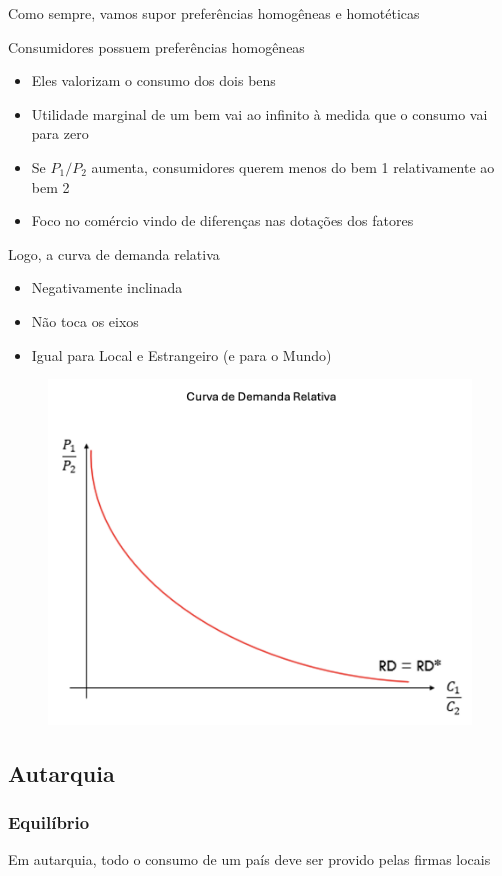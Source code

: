 \documentclass[a4paper,12pt]{article}[abntex2]
\begin{document}
Como sempre, vamos supor preferências homogêneas e homotéticas

Consumidores possuem preferências homogêneas
\begin{itemize}
    \item Eles valorizam o consumo dos dois bens
    \item Utilidade marginal de um bem vai ao infinito à medida que o consumo vai para zero
    \item Se \( P_1 / P_2 \) aumenta, consumidores querem menos do bem 1 relativamente ao bem 2
    \item Foco no comércio vindo de diferenças nas dotações dos fatores
\end{itemize}

Logo, a curva de demanda relativa
\begin{itemize}
    \item Negativamente inclinada
    \item Não toca os eixos
    \item Igual para Local e Estrangeiro (e para o Mundo)
\end{itemize}

\begin{figure}[H]
    \centering
    \includegraphics[width=0.7\linewidth]{Imagens/a12i9.png}
\end{figure}

\subsection{\textbf{Autarquia}}
\subsubsection{\textbf{Equilíbrio}}
Em autarquia, todo o consumo de um país deve ser provido pelas firmas locais
\end{document}
